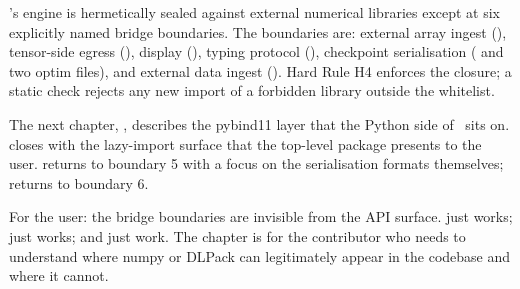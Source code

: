 \Lucid's engine is hermetically sealed against external numerical
libraries except at six explicitly named bridge boundaries. The
boundaries are: external array ingest (),
tensor-side egress (), display
(), typing protocol (),
checkpoint serialisation ( and two optim
files), and external data ingest (). Hard Rule
H4 enforces the closure; a static check rejects any new import of
a forbidden library outside the whitelist.

The next chapter, , describes the
pybind11 layer that the Python side of \Lucid\ sits on.
 closes  with the
lazy-import surface that the top-level package presents to the
user.  returns to boundary 5 with a focus
on the serialisation formats themselves; 
returns to boundary 6.

\begin{lucidnote}
For the user: the bridge boundaries are invisible from the API
surface.  just works; 
just works;  and  just work.
The chapter is for the contributor who needs to understand where
numpy or DLPack can legitimately appear in the codebase and where
it cannot.
\end{lucidnote}
